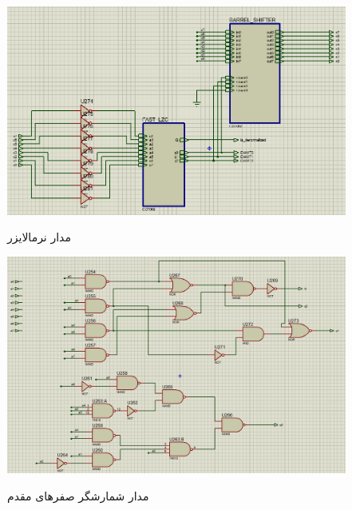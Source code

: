 \documentclass[twoside]{article}
\begin{document}
\begin{itemize}
	\begin{figure}[h!]
		\begin{center}
			\includegraphics[scale=0.4]{normalizer_insider}‎
			\caption{مدار نرمالایزر}
		\end{center}
	\end{figure} 
	\begin{figure}[h!]
		\begin{center}
			\includegraphics[scale=0.4]{lzc_insider}‎
			\caption{مدار شمارشگر صفرهای مقدم}
		\end{center}
	\end{figure} 
	

\end{itemize}
\end{document}
